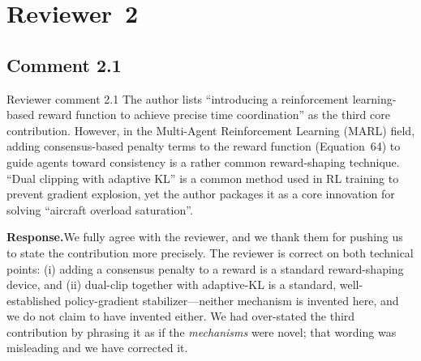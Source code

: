 \documentclass[11pt]{article}
\newcommand{\rsp}{\medskip\noindent\textbf{Response.}\quad}
\begin{document}
\section*{Reviewer~2}

\subsection*{Comment 2.1}

\begin{reviewercomment}{Reviewer comment 2.1}
The author lists ``introducing a reinforcement learning-based reward function to
achieve precise time coordination'' as the third core contribution. However, in the
Multi-Agent Reinforcement Learning (MARL) field, adding consensus-based penalty terms
to the reward function (Equation~64) to guide agents toward consistency is a rather
common reward-shaping technique. ``Dual clipping with adaptive KL'' is a common method
used in RL training to prevent gradient explosion, yet the author packages it as a core
innovation for solving ``aircraft overload saturation''.
\end{reviewercomment}

\rsp We fully agree with the reviewer, and we thank them for pushing us to state the
contribution more precisely. The reviewer is correct on both technical points:
(i) adding a consensus penalty to a reward is a standard reward-shaping device, and
(ii) dual-clip together with adaptive-KL is a standard, well-established policy-gradient
stabilizer---neither mechanism is invented here, and we do not claim to have invented
either. We had over-stated the third contribution by phrasing it as if the
\emph{mechanisms} were novel; that wording was misleading and we have corrected it.
\end{document}
